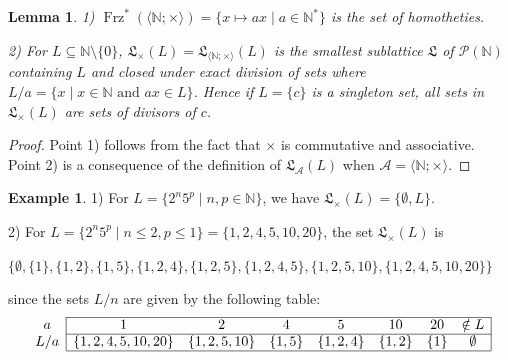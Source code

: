 \documentclass[11pt,a4paper]{article}
\newtheorem{lemma}[theorem]{Lemma}
\theoremstyle{definition} %
\newtheorem{example}[theorem]{Example}
\newcommand\+[1]{\mathcal{#1}} %
\newcommand{\N}{{\mathbb N}}     %
\newcommand{\Latt}{{\mathfrak{L}}}
\DeclareMathOperator{\freez}{Frz}%
\newcommand{\DUO}{{\freez}^*}
\begin{document}
%
\begin{lemma}\label{NX} 
1) $ \DUO(\langle \N ; \times\rangle)=\{ x\mapsto ax\mid a\in\N^*\}$ is the set of homotheties.

2)   For $L\subseteq \N\setminus\{0\}$,  $\Latt_\times(L)=\Latt_{\langle \N ; \times\rangle}(L)$ is  the smallest sublattice $\Latt$ of  $\+P(\N)$ containing $L$ and closed  under exact division of sets where $L/a=\{x\mid x\in\N {\text{ and \ }}ax\in L\}$. Hence if  $L=\{c\}$ is a singleton set, all sets in $\Latt_\times(L)$ are sets of divisors of $c$.
  \end{lemma}
  \begin{proof} Point 1) follows from the fact that $\times$ is commutative and associative. Point 2) is a consequence of the definition of $\Latt_{\+A}(L)$ when $\+A=\langle \N ; \times\rangle$.
  \end{proof}
   
 \begin{example}  1) For $L=\{2^n5^p\mid n,p\in\N\}$, we have $\Latt_\times(L)=\{\emptyset,L\}$.
 

2) For $L=\{2^n5^p\mid n\leq 2, p\leq 1\}=\{1,2,4,5,10,20\}$, the set $\Latt_\times(L)$ is

$\big\{\emptyset,\{1\},\{1,2\},\{1,5\},\{1,2,4\},\{1,2,5\},
\{1,2,4,5\}, \{1,2,5,10\}, \allowbreak  \{1,2,4,5,10,20\}\big\}$

\noindent since the sets $L/n$ are  given by the following table:
$$
\begin{array}{c|ccccccc|}
\cline{2-8}
a&1&2&4&5&10&20&\notin L\\\cline{2-8}
L/a&\{1,2,4,5,10,20\}&\{1,2,5,10\}&\{1,5\}&\{1,2,4\}&\{1,2\}&\{1\}&\emptyset
\\\cline{2-8}
\end{array}
$$
\end{example}
\end{document}
